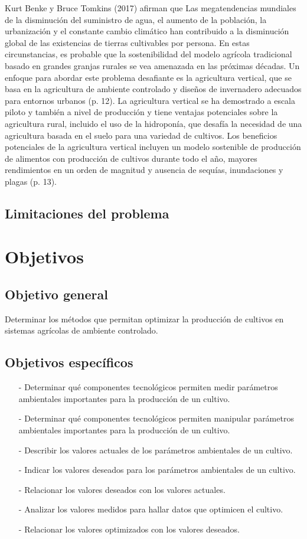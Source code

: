 \documentclass{report}
\begin{document}
\begin{enumerate}
  Kurt Benke y Bruce Tomkins (2017) afirman que Las megatendencias mundiales de
  la disminución del suministro de agua, el aumento de la población, la
  urbanización y el constante cambio climático han contribuido a la disminución
  global de las existencias de tierras cultivables por persona. En estas
  circunstancias, es probable que la sostenibilidad del modelo agrícola
  tradicional basado en grandes granjas rurales se vea amenazada en las próximas
  décadas. Un enfoque para abordar este problema desafiante es la agricultura
  vertical, que se basa en la agricultura de ambiente controlado y diseños de
  invernadero adecuados para entornos urbanos (p. 12). La agricultura vertical
  se ha demostrado a escala piloto y también a nivel de producción y tiene
  ventajas potenciales sobre la agricultura rural, incluido el uso de la
  hidroponía, que desafía la necesidad de una agricultura basada en el suelo
  para una variedad de cultivos. Los beneficios potenciales de la agricultura
  vertical incluyen un modelo sostenible de producción de alimentos con
  producción de cultivos durante todo el año, mayores rendimientos en un orden
  de magnitud y ausencia de sequías, inundaciones y plagas (p. 13).
\end{enumerate}
\subsection{Limitaciones del problema}
\section{Objetivos}
\subsection{Objetivo general}
Determinar los métodos que permitan optimizar la producción de cultivos en
sistemas agrícolas de ambiente controlado.
\subsection{Objetivos específicos}
\begin{enumerate}
\item[-] Determinar qué componentes tecnológicos permiten medir parámetros
  ambientales importantes para la producción de un cultivo.
\item[-] Determinar qué componentes tecnológicos permiten manipular parámetros
  ambientales importantes para la producción de un cultivo.
\item[-] Describir los valores actuales de los parámetros ambientales de un
  cultivo.
\item[-] Indicar los valores deseados para los parámetros ambientales de un
  cultivo.
\item[-] Relacionar los valores deseados con los valores actuales.
\item[-] Analizar los valores medidos para hallar datos que optimicen el cultivo.
\item[-] Relacionar los valores optimizados con los valores deseados.
\end{enumerate}
\end{document}
